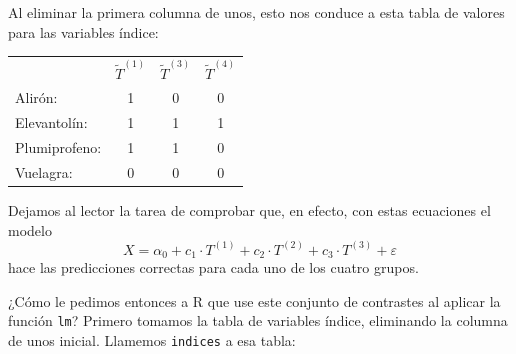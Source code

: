 \documentclass[10pt,a4paper]{article}\usepackage[]{graphicx}\usepackage[]{color}
\newcounter {cont01}
\begin{document}
Al eliminar la primera columna de unos, esto nos conduce a esta tabla de valores para las variables índice:
\begin{center}
\begin{tabular}{l|c|c|c|}
\cline{2-4}
            \rule{0mm}{5mm}   & $\tilde{T}^{(1)}$&$\tilde{T}^{(3)}$&$\tilde{T}^{(4)}$ \\
\cline{2-4}
\mbox{Alirón:}&1&0&0 \\
\cline{2-4}
\mbox{Elevantolín:}&1&1&1 \\
\cline{2-4}
\mbox{Plumiprofeno:}&1&1&0 \\
\cline{2-4}
\mbox{Vuelagra:}&0&0&0 \\
\cline{2-4}
\end{tabular}
\end{center}
Dejamos al lector la tarea de comprobar que, en efecto, con estas ecuaciones el modelo
$$X = \alpha_0 + c_1 \cdot T^{(1)} + c_2 \cdot T^{(2)} + c_3 \cdot T^{(3)} + \varepsilon$$
hace las predicciones correctas para cada uno de los cuatro grupos.

¿Cómo le pedimos entonces a R que use este conjunto de contrastes al aplicar la función {\tt lm}? Primero tomamos la tabla de variables índice, eliminando la columna de unos inicial. Llamemos {\tt indices} a esa tabla:
\end{document}
